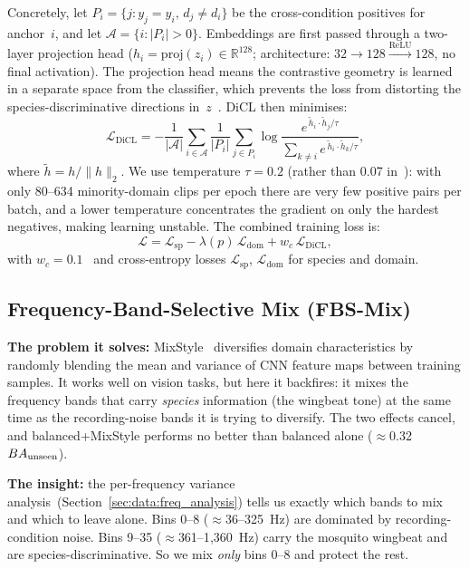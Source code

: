 Concretely, let $P_i = \{j : y_j = y_i,\, d_j \neq d_i\}$ be the
cross-condition positives for anchor~$i$, and let
$\mathcal{A} = \{i : |P_i| > 0\}$.
Embeddings are first passed through a two-layer projection head
($h_i = \mathrm{proj}(z_i) \in \mathbb{R}^{128}$; architecture:
$32{\to}128{\xrightarrow{\mathrm{ReLU}}}128$, no final activation).
The projection head means the contrastive geometry is learned in a
separate space from the classifier, which prevents the loss from
distorting the species-discriminative directions in~$z$~\cite{supcon2020}.
DiCL then minimises:
\begin{equation}
  \mathcal{L}_{\mathrm{DiCL}} =
  {-}\frac{1}{|\mathcal{A}|}\!\sum_{i \in \mathcal{A}}
  \frac{1}{|P_i|}\!\sum_{j \in P_i}
  \log\frac{e^{\,\tilde{h}_i \cdot \tilde{h}_j / \tau}}
           {\sum_{k \neq i} e^{\,\tilde{h}_i \cdot \tilde{h}_k / \tau}},
  \label{eq:dicl}
\end{equation}
where $\tilde{h} = h / \|h\|_2$.
We use temperature $\tau{=}0.2$ (rather than 0.07 in~\cite{drbiol2025}):
with only 80--634 minority-domain clips per epoch there are very few
positive pairs per batch, and a lower temperature concentrates the
gradient on only the hardest negatives, making learning unstable.
The combined training loss is:
\begin{equation}
  \mathcal{L} = \mathcal{L}_{\mathrm{sp}} - \lambda(p)\,\mathcal{L}_{\mathrm{dom}}
              + w_c\,\mathcal{L}_{\mathrm{DiCL}},
  \label{eq:total_loss}
\end{equation}
with $w_c{=}0.1$~\cite{drbiol2025} and cross-entropy losses
$\mathcal{L}_{\mathrm{sp}}$, $\mathcal{L}_{\mathrm{dom}}$ for species
and domain.

\subsection{Frequency-Band-Selective Mix (FBS-Mix)}
\label{sec:method:fbsmix}

\textbf{The problem it solves:}
MixStyle~\cite{mixstyle2021} diversifies domain characteristics by
randomly blending the mean and variance of CNN feature maps between
training samples.
It works well on vision tasks, but here it backfires: it mixes the
frequency bands that carry \emph{species} information (the wingbeat
tone) at the same time as the recording-noise bands it is trying to
diversify.
The two effects cancel, and balanced+MixStyle performs no better than
balanced alone ($\approx$0.32~$BA_{\text{unseen}}$).

\textbf{The insight:}
the per-frequency variance analysis~(Section~\ref{sec:data:freq_analysis})
tells us exactly which bands to mix and which to leave alone.
Bins 0--8 ($\approx$36--325~Hz) are dominated by recording-condition
noise.
Bins 9--35 ($\approx$361--1{,}360~Hz) carry the mosquito wingbeat and
are species-discriminative.
So we mix \emph{only} bins 0--8 and protect the rest.

